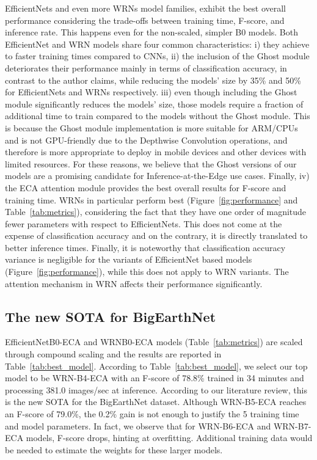 \documentclass[journal]{IEEEtran}
\begin{document}
EfficientNets and even more WRNs model families, exhibit the best overall performance considering the trade-offs between training time, F-score, and inference rate. This happens even for the non-scaled, simpler B0 models. Both EfficientNet and WRN models share four common characteristics: i) they achieve  to  faster training times compared to CNNs, ii) the inclusion of the Ghost module deteriorates their performance mainly in terms of classification accuracy, in contrast to the author claims, while reducing the models' size by 35\% and 50\% for EfficientNets and WRNs respectively. iii) even though including the Ghost module significantly reduces the models' size, those models require a fraction of additional time to train compared to the models without the Ghost module. This is because the Ghost module implementation is more suitable for ARM/CPUs and is not GPU-friendly due to the Depthwise Convolution operations, and therefore is more appropriate to deploy in mobile devices and other devices with limited resources. For these reasons, we believe that the Ghost versions of our models are a promising candidate for Inference-at-the-Edge use cases. 
Finally, iv) the ECA attention module provides the best overall results for F-score and training time. WRNs in particular perform best (Figure~\ref{fig:performance} and Table~\ref{tab:metrics}), considering the fact that they have one order of magnitude fewer parameters with respect to EfficientNets. This does not come at the expense of classification accuracy and on the contrary, it is directly translated to better inference times. 
Finally, it is noteworthy that classification accuracy variance is negligible for the variants of EfficientNet based models (Figure~\ref{fig:performance}), while this does not apply to WRN variants. The attention mechanism in WRN affects their performance significantly. 

\subsection{The new SOTA for BigEarthNet}
EfficientNetB0-ECA and WRNB0-ECA models (Table~\ref{tab:metrics}) are scaled through compound scaling and the results are reported in Table~\ref{tab:best_model}. According to Table~\ref{tab:best_model}, we select our top model to be WRN-B4-ECA with an F-score of 78.8\% trained in 34 minutes and processing 381.0 images/sec at inference. According to our literature review, this is the new SOTA for the BigEarthNet dataset. Although WRN-B5-ECA reaches an F-score of 79.0\%, the 0.2\% gain is not enough to justify the 5 training time and model parameters. In fact, we observe that for WRN-B6-ECA and WRN-B7-ECA  models, F-score drops, hinting at overfitting. Additional training data would be needed to estimate the weights for these larger models. 
\end{document}
